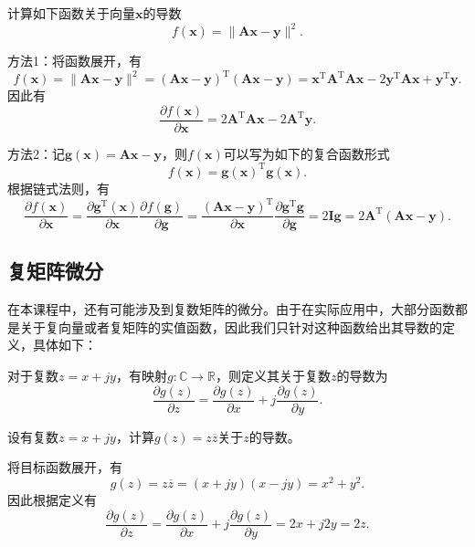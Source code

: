 \begin{example}
    计算如下函数关于向量\( \bm{x} \)的导数
    \[
        f(\bm{x}) = \|\mathbf{A}\bm{x} - \bm{y}\|^2.
    \]
\end{example}
\begin{solution}
    方法1：将函数展开，有
    \[
        f(\bm{x}) = \|\mathbf{A}\bm{x} - \bm{y}\|^2 = (\mathbf{A}\bm{x} - \bm{y})^{\mathrm{T}}(\mathbf{A}\bm{x} - \bm{y}) = \bm{x}^{\mathrm{T}} \mathbf{A}^{\mathrm{T}} \mathbf{A} \bm{x} - 2\bm{y}^{\mathrm{T}} \mathbf{A} \bm{x} + \bm{y}^{\mathrm{T}} \bm{y}.
    \]
    因此有
    \[
        \frac{\partial f(\bm{x})}{\partial \bm{x}} = 2 \mathbf{A}^{\mathrm{T}} \mathbf{A} \bm{x} - 2 \mathbf{A}^{\mathrm{T}} \bm{y}.
    \]

    方法2：记\( \mathbf{g}(\bm{x}) = \mathbf{A}\bm{x} - \bm{y} \)，则\( f(\bm{x}) \)可以写为如下的复合函数形式
    \[
        f(\bm{x}) = \mathbf{g}(\bm{x})^{\mathrm{T}} \mathbf{g}(\bm{x}).
    \]
    根据链式法则，有
    \[
        \frac{\partial f(\bm{x})}{\partial \bm{x}} = \frac{\partial \mathbf{g}^{\mathrm{T}}(\bm{x})}{\partial \bm{x}}\frac{\partial f(\mathbf{g})}{\partial \mathbf{g}} = \frac{(\mathbf{A} \bm{x} - \bm{y})^{\mathrm{T}}}{ \partial \bm{x}} \frac{\partial \mathbf{g}^{\mathrm{T}} \mathbf{g}}{\partial \mathbf{g}} = 2 \mathbf{I}  \mathbf{g} = 2 \mathbf{A}^{\mathrm{T}} (\mathbf{A}\bm{x} - \bm{y}).
    \]
\end{solution}

\subsection{复矩阵微分}

在本课程中，还有可能涉及到复数矩阵的微分。由于在实际应用中，大部分函数都是关于复向量或者复矩阵的实值函数，因此我们只针对这种函数给出其导数的定义，具体如下：

\begin{definition}
    对于复数\( z = x + jy \)，有映射\( g: \mathbb{C} \rightarrow \mathbb{R} \)，则定义其关于复数\( z \)的导数为
    \[
        \frac{\partial g(z)}{\partial z} = \frac{\partial g(z)}{\partial x} + j \frac{\partial g(z)}{\partial y}.
    \]
\end{definition}

\begin{example}
    设有复数\( z = x + jy \)，计算\( g(z) = z \overline{z} \)关于\( z \)的导数。
\end{example}
\begin{solution}
    将目标函数展开，有
    \[
        g(z) = z \overline{z} = (x + jy)(x - jy) = x^2 + y^2.
    \]
    因此根据定义有
    \[
        \frac{\partial g(z)}{\partial z} = \frac{\partial g(z)}{\partial x} + j \frac{\partial g(z)}{\partial y} = 2x + j 2y = 2z.
    \]
\end{solution}

